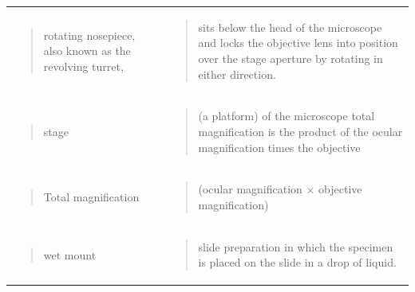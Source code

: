 \documentclass[
  letterpaper,
  DIV=11,
  numbers=noendperiod]{scrreprt}
\begin{document}
{\begin{longtable}[]{@{}
  >{\centering\arraybackslash}p{}
  >{\centering\arraybackslash}p{}@{}}
\begin{minipage}[t]{\linewidth}\centering
\begin{quote}
rotating nosepiece, also known as the revolving turret,
\end{quote}
\end{minipage} & \begin{minipage}[t]{\linewidth}\centering
\begin{quote}
sits below the head of the microscope and locks the objective lens into
position over the stage aperture by rotating in either direction.
\end{quote}
\end{minipage} \\
\begin{minipage}[t]{\linewidth}\centering
\begin{quote}
stage
\end{quote}
\end{minipage} & \begin{minipage}[t]{\linewidth}\centering
\begin{quote}
(a platform) of the microscope total magnification is the product of the
ocular magnification times the objective
\end{quote}
\end{minipage} \\
\begin{minipage}[t]{\linewidth}\centering
\begin{quote}
Total magnification
\end{quote}
\end{minipage} & \begin{minipage}[t]{\linewidth}\centering
\begin{quote}
(ocular magnification × objective magnification)
\end{quote}
\end{minipage} \\
\begin{minipage}[t]{\linewidth}\centering
\begin{quote}
wet mount
\end{quote}
\end{minipage} & \begin{minipage}[t]{\linewidth}\centering
\begin{quote}
slide preparation in which the specimen is placed on the slide in a drop
of liquid.
\end{quote}
\end{minipage} \\

\end{longtable}}
\end{document}
